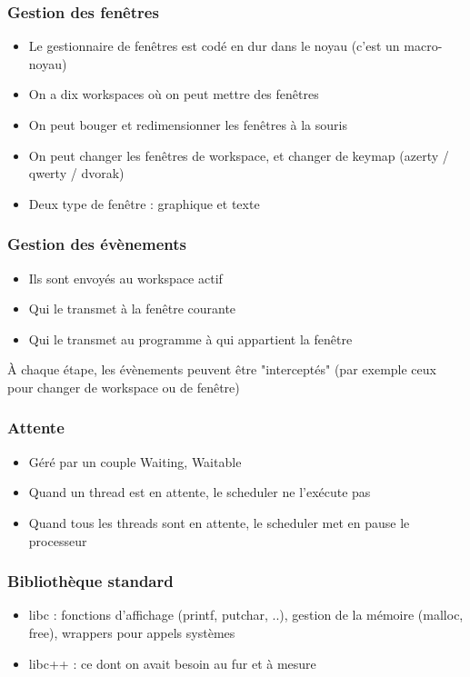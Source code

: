 \documentclass[aspectration=43]{beamer}
\begin{document}
\begin{frame}
    \frametitle{Gestion des fenêtres}
    \begin{itemize}
        \item Le gestionnaire de fenêtres est codé en dur dans le noyau (c'est un macro-noyau)
        \item On a dix workspaces où on peut mettre des fenêtres
        \item On peut bouger et redimensionner les fenêtres à la souris
        \item On peut changer les fenêtres de workspace, et changer de keymap (azerty / qwerty / dvorak)
        \item Deux type de fenêtre : graphique et texte
    \end{itemize}
\end{frame}

\begin{frame}
    \frametitle{Gestion des évènements}
    \begin{itemize}
        \item Ils sont envoyés au workspace actif
        \item Qui le transmet à la fenêtre courante
        \item Qui le transmet au programme à qui appartient la fenêtre
    \end{itemize}
    À chaque étape, les évènements peuvent être "interceptés" (par exemple ceux pour changer de workspace ou de fenêtre)
\end{frame}

\begin{frame}
    \frametitle{Attente}
    \begin{itemize}
        \item Géré par un couple Waiting, Waitable
        \item Quand un thread est en attente, le scheduler ne l'exécute pas
        \item Quand tous les threads sont en attente, le scheduler met en pause le processeur
    \end{itemize}
\end{frame}

\begin{frame}
    \frametitle{Bibliothèque standard}
    \begin{itemize}
        \item libc : fonctions d'affichage (printf, putchar, ..), gestion de la mémoire (malloc, free), wrappers pour appels systèmes
        \item libc++ : ce dont on avait besoin au fur et à mesure
    \end{itemize}
\end{frame}
\end{document}
